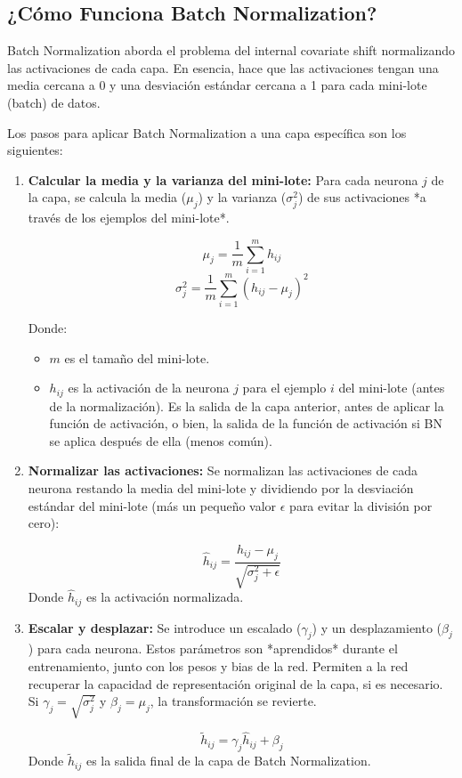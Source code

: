 \documentclass{article}
\begin{document}
\subsection{¿Cómo Funciona Batch Normalization?}

Batch Normalization aborda el problema del internal covariate shift normalizando las activaciones de cada capa.  En esencia, hace que las activaciones tengan una media cercana a 0 y una desviación estándar cercana a 1 para cada mini-lote (batch) de datos.

Los pasos para aplicar Batch Normalization a una capa específica son los siguientes:

\begin{enumerate}
    \item \textbf{Calcular la media y la varianza del mini-lote:} Para cada neurona \(j\) de la capa, se calcula la media (\(\mu_j\)) y la varianza (\(\sigma^2_j\)) de sus activaciones *a través de los ejemplos del mini-lote*.

    \[
    \mu_j = \frac{1}{m} \sum_{i=1}^{m} h_{ij}
    \]
    \[
    \sigma^2_j = \frac{1}{m} \sum_{i=1}^{m} (h_{ij} - \mu_j)^2
    \]

    Donde:
    \begin{itemize}
        \item \(m\) es el tamaño del mini-lote.
        \item \(h_{ij}\) es la activación de la neurona \(j\) para el ejemplo \(i\) del mini-lote (antes de la normalización). Es la salida de la capa anterior, antes de aplicar la función de activación, o bien, la salida de la función de activación si BN se aplica después de ella (menos común).
    \end{itemize}

    \item \textbf{Normalizar las activaciones:} Se normalizan las activaciones de cada neurona restando la media del mini-lote y dividiendo por la desviación estándar del mini-lote (más un pequeño valor \(\epsilon\) para evitar la división por cero):

    \[
    \hat{h}_{ij} = \frac{h_{ij} - \mu_j}{\sqrt{\sigma^2_j + \epsilon}}
    \]
    Donde \(\hat{h}_{ij}\) es la activación normalizada.

    \item \textbf{Escalar y desplazar:} Se introduce un escalado (\(\gamma_j\)) y un desplazamiento (\(\beta_j\)) para cada neurona.  Estos parámetros son *aprendidos* durante el entrenamiento, junto con los pesos y bias de la red.  Permiten a la red recuperar la capacidad de representación original de la capa, si es necesario.  Si \(\gamma_j = \sqrt{\sigma^2_j}\) y \(\beta_j = \mu_j\), la transformación se revierte.

    \[
    \tilde{h}_{ij} = \gamma_j \hat{h}_{ij} + \beta_j
    \]
     Donde \(\tilde{h}_{ij}\) es la salida final de la capa de Batch Normalization.
\end{enumerate}
\end{document}

